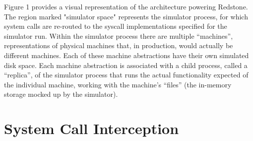 {\fontsize{12}{15}\selectfont 
Figure 1 provides a visual representation of the architecture powering Redstone.
The region marked "simulator space" represents the simulator process,
for which system calls are re-routed to the syscall implementations specified for the simulator run.
Within the simulator process there are multiple “machines”,
representations of physical machines that, in production, would actually be different machines.
Each of these machine abstractions have their own simulated disk space.
Each machine abstraction is associated with a child process,
called a “replica”,
of the simulator process that runs the actual functionality expected of the individual machine,
working with the machine’s “files” (the in-memory storage mocked up by the simulator).

}

\section{\txtrsdust System Call Interception}

